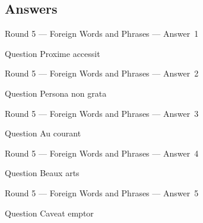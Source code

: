 \documentclass[11pt]{beamer}
\begin{document}
\subsection{Answers}
\begin{frame}[t]{Round 5 --- Foreign Words and Phrases --- \mbox{Answer 1}}
    \vspace{-0.5em}
    \begin{block}{Question}
        Proxime accessit
    \end{block}
\end{frame}
\begin{frame}[t]{Round 5 --- Foreign Words and Phrases --- \mbox{Answer 2}}
    \vspace{-0.5em}
    \begin{block}{Question}
        Persona non grata
    \end{block}
\end{frame}
\begin{frame}[t]{Round 5 --- Foreign Words and Phrases --- \mbox{Answer 3}}
    \vspace{-0.5em}
    \begin{block}{Question}
        Au courant
    \end{block}
\end{frame}
\begin{frame}[t]{Round 5 --- Foreign Words and Phrases --- \mbox{Answer 4}}
    \vspace{-0.5em}
    \begin{block}{Question}
        Beaux arts
    \end{block}
\end{frame}
\begin{frame}[t]{Round 5 --- Foreign Words and Phrases --- \mbox{Answer 5}}
    \vspace{-0.5em}
    \begin{block}{Question}
        Caveat emptor
    \end{block}
\end{frame}
\end{document}

